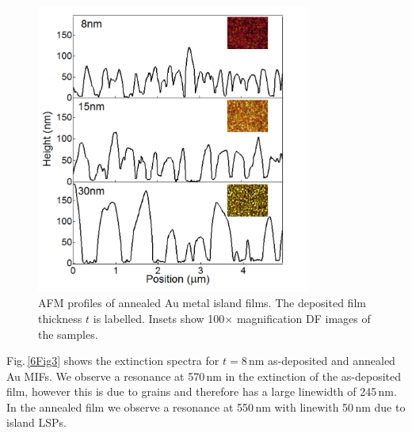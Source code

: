 \begin{figure}[h!] 
\centering    
\includegraphics[width=0.8\textwidth]{Fig2}
\caption{AFM profiles of annealed Au metal island films. The deposited film thickness $t$ is labelled. Insets show 100$\times$ magnification DF images of the samples.}
\label{6Fig2}
\end{figure}

Fig.\,\ref{6Fig3} shows the extinction spectra for $t=8$\,nm as-deposited and annealed Au MIFs. We observe a resonance at 570\,nm in the extinction of the as-deposited film, however this is due to grains and therefore has a large linewidth of 245\,nm. In the annealed film we observe a resonance at 550\,nm with linewith 50\,nm due to island LSPs.

